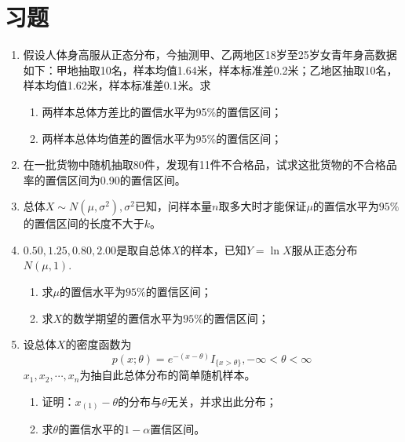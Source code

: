 \section{习题}
\begin{enumerate}
    \item 假设人体身高服从正态分布，今抽测甲、乙两地区18岁至25岁女青年身高数据如下：甲地抽取10名，样本均值1.64米，样本标准差0.2米；乙地区抽取10名，样本均值1.62米，样本标准差0.1米。求
    \begin{enumerate}
        \item 两样本总体方差比的置信水平为95\%的置信区间；
        \item 两样本总体均值差的置信水平为95\%的置信区间；
    \end{enumerate}

\item 在一批货物中随机抽取80件，发现有11件不合格品，试求这批货物的不合格品率的置信区间为0.90的置信区间。

\item 总体$X\sim N(\mu,\sigma^2),\sigma^2$已知，问样本量$n$取多大时才能保证$\mu$的置信水平为$95\%$的置信区间的长度不大于$k$。


\item $0.50,1.25,0.80,2.00$是取自总体$X$的样本，已知$Y = \ln X$服从正态分布$N(\mu,1)$.
\begin{enumerate}
    \item 求$\mu$的置信水平为$95\%$的置信区间；
    \item 求$X$的数学期望的置信水平为$95\%$的置信区间；
\end{enumerate}

\item  设总体$X$的密度函数为
$$
p(x;\theta) = e^{-(x-\theta)} I_{\{ x>\theta \}}, -\infty < \theta < \infty
$$
$x_1,x_2,\cdots,x_n$为抽自此总体分布的简单随机样本。 
\begin{enumerate}
    \item 证明：$x_{(1)} - \theta$的分布与$\theta$无关，并求出此分布；
    \item 求$\theta$的置信水平的$1-\alpha$置信区间。
\end{enumerate}
\end{enumerate}